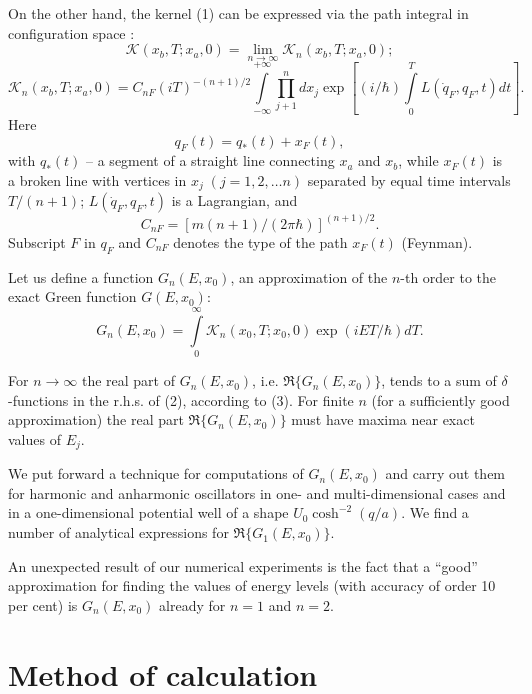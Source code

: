 \documentclass[11pt]{article}
\begin{document}
On the other hand, the kernel (1) can be expressed via the path integral in configuration space \cite{1,2}:
\begin{equation}\label{eq3}
\mathcal{K}(x_{b},T;x_{a},0)= \lim_{n\to\infty}\mathcal{K}_n(x_{b},T;x_{a},0);
\end{equation}
\begin{equation}\label{4}
  \mathcal{K}_n(x_b,T;x_a,0)=C_{nF}(iT)^{-(n+1)/2} \int\limits_{-\infty}^{+\infty}\prod_{j+1}^n
  dx_j\exp[(i/\hbar)\int\limits_0^T L(\dot{q}_F,q_F,t)dt].
\end{equation}
Here
\begin{equation}\label{eq5}
  q_F(t)=q_*(t)+x_F(t),
\end{equation}
with $q_*(t)$ -- a segment of a straight line connecting $x_a$ and $x_b$, while
$x_F(t)$ is a broken line with vertices in
$x_j \; (j=1,2,\ldots n)$ separated by equal time intervals $T/(n+1)$;
$L(\dot{q}_F,q_F,t)$ is a Lagrangian, and
\begin{equation}\label{eq6}
  C_{nF}=[m(n+1)/(2\pi\hbar)]^{(n+1)/2}.
\end{equation}
Subscript $F$ in $q_F$ and $C_{nF}$ denotes the  type of the path $x_F(t)$ (Feynman).

Let us define a function $G_n(E,x_0)$, an approximation of the
$n$-th order to the exact Green function $G(E,x_0)$:
\begin{equation}\label{eq7}
  G_n(E,x_0)=\int\limits_0^\infty \mathcal{K}_n(x_0,T;x_0,0)\exp(iET/\hbar)dT.
\end{equation}

For $n\to \infty $ the real part of $G_n(E,x_0)$, i.e.  $\Re \{G_n(E,x_0)\}$, tends
to a sum of  $\delta$-functions in the r.h.s. of (2), according to (3). For finite
$n$ (for a sufficiently good approximation) the real part $\Re \{G_n(E,x_0)\}$
must have maxima near exact values of  $E_j$.

We put forward a technique for computations of $G_n(E,x_0)$ and carry out them
for harmonic and anharmonic oscillators in one- and multi-dimensional cases and
in a one-dimensional potential well of a shape $U_0\cosh^{-2}(q/a)$. We  find a number of analytical expressions  for $\Re \{G_1(E,x_0)\}$.

An unexpected result of our numerical experiments is the fact that a ``good''
approximation for finding the values of energy levels (with accuracy of order 10 per cent) is $G_n(E,x_0)$ already for $n=1$ and  $n=2$.

\section{Method of calculation}
\end{document}
